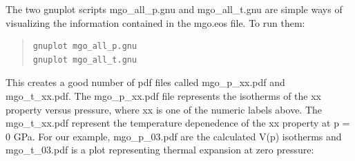 \documentclass[a4paper]{article}
\begin{document}
The two gnuplot scripts mgo\_all\_p.gnu and mgo\_all\_t.gnu are simple
ways of visualizing the information contained in the mgo.eos file. To
run them:

\begin{quote}
\begin{verbatim}
gnuplot mgo_all_p.gnu
gnuplot mgo_all_t.gnu
\end{verbatim}
\end{quote}

This creates a good number of pdf files called mgo\_p\_xx.pdf
and mgo\_t\_xx.pdf. The mgo\_p\_xx.pdf file represents the isotherms of
the xx property versus pressure, where xx is one of the numeric labels
above. The mgo\_t\_xx.pdf represent the temperature depenedence of the
xx property at p = 0 GPa. For our example, mgo\_p\_03.pdf are the
calculated V(p) isotherms and mgo\_t\_03.pdf is a plot representing
thermal expansion at zero pressure:

\noindent{}

\noindent{}
\end{document}
